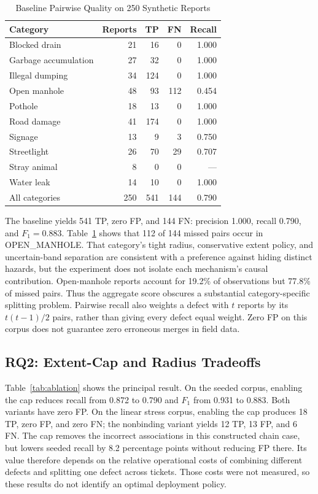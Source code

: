 \documentclass[conference,a4paper]{IEEEtran}
\begin{document}
\begin{table}[t]
\caption{Baseline Pairwise Quality on 250 Synthetic Reports}
\label{tab:quality}
\centering\small
\begin{tabular}{@{}lrrrr@{}}
\toprule
Category & Reports & TP & FN & Recall\\
\midrule
Blocked drain & 21 & 16 & 0 & 1.000\\
Garbage accumulation & 27 & 32 & 0 & 1.000\\
Illegal dumping & 34 & 124 & 0 & 1.000\\
Open manhole & 48 & 93 & 112 & 0.454\\
Pothole & 18 & 13 & 0 & 1.000\\
Road damage & 41 & 174 & 0 & 1.000\\
Signage & 13 & 9 & 3 & 0.750\\
Streetlight & 26 & 70 & 29 & 0.707\\
Stray animal & 8 & 0 & 0 & ---\\
Water leak & 14 & 10 & 0 & 1.000\\
\midrule
All categories & 250 & 541 & 144 & 0.790\\
\bottomrule
\end{tabular}
\end{table}

The baseline yields 541 TP, zero FP, and 144 FN: precision 1.000, recall 0.790, and $F_1=0.883$. Table~\ref{tab:quality} shows that 112 of 144 missed pairs occur in OPEN\_MANHOLE. That category's tight radius, conservative extent policy, and uncertain-band separation are consistent with a preference against hiding distinct hazards, but the experiment does not isolate each mechanism's causal contribution. Open-manhole reports account for 19.2\% of observations but 77.8\% of missed pairs. Thus the aggregate score obscures a substantial category-specific splitting problem. Pairwise recall also weights a defect with $t$ reports by its $t(t-1)/2$ pairs, rather than giving every defect equal weight. Zero FP on this corpus does not guarantee zero erroneous merges in field data.

\subsection{RQ2: Extent-Cap and Radius Tradeoffs}
Table~\ref{tab:ablation} shows the principal result. On the seeded corpus, enabling the cap reduces recall from 0.872 to 0.790 and $F_1$ from 0.931 to 0.883. Both variants have zero FP. On the linear stress corpus, enabling the cap produces 18 TP, zero FP, and zero FN; the nonbinding variant yields 12 TP, 13 FP, and 6 FN. The cap removes the incorrect associations in this constructed chain case, but lowers seeded recall by 8.2 percentage points without reducing FP there. Its value therefore depends on the relative operational costs of combining different defects and splitting one defect across tickets. Those costs were not measured, so these results do not identify an optimal deployment policy.
\end{document}

